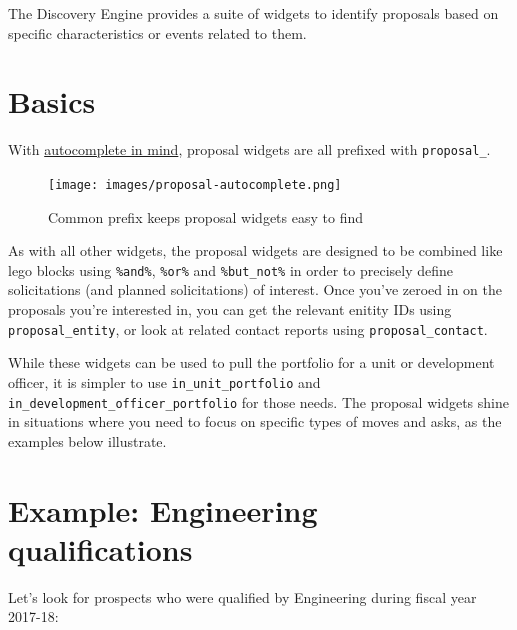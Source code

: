 \documentclass[]{book}
\newenvironment{Shaded}{\begin{snugshade}}{\end{snugshade}}
\newcommand{\DataTypeTok}[1]{\textcolor[rgb]{0.13,0.29,0.53}{#1}}
\newcommand{\DecValTok}[1]{\textcolor[rgb]{0.00,0.00,0.81}{#1}}
\newcommand{\KeywordTok}[1]{\textcolor[rgb]{0.13,0.29,0.53}{\textbf{#1}}}
\newcommand{\NormalTok}[1]{#1}
\newcommand{\OperatorTok}[1]{\textcolor[rgb]{0.81,0.36,0.00}{\textbf{#1}}}
\newcommand{\StringTok}[1]{\textcolor[rgb]{0.31,0.60,0.02}{#1}}
\begin{document}
The Discovery Engine provides a suite of widgets to identify proposals based on specific characteristics or events related to them.

\hypertarget{basics-2}{%
\section{Basics}\label{basics-2}}

With \protect\hyperlink{working-with-autocomplete}{autocomplete in mind}, proposal widgets are all prefixed with \texttt{proposal\_}.

\begin{figure}
\centering
\texttt{[image: images/proposal-autocomplete.png]}
\caption{Common prefix keeps proposal widgets easy to find}
\end{figure}

As with all other widgets, the proposal widgets are designed to be combined like lego blocks using \texttt{\%and\%}, \texttt{\%or\%} and \texttt{\%but\_not\%} in order to precisely define solicitations (and planned solicitations) of interest. Once you've zeroed in on the proposals you're interested in, you can get the relevant enitity IDs using \texttt{proposal\_entity}, or look at related contact reports using \texttt{proposal\_contact}.

While these widgets can be used to pull the portfolio for a unit or development officer, it is simpler to use \texttt{in\_unit\_portfolio} and \texttt{in\_development\_officer\_portfolio} for those needs. The proposal widgets shine in situations where you need to focus on specific types of moves and asks, as the examples below illustrate.

\hypertarget{example-engineering-qualifications}{%
\section{Example: Engineering qualifications}\label{example-engineering-qualifications}}

Let's look for prospects who were qualified by Engineering during fiscal year 2017-18:

\begin{Shaded}
\end{Shaded}
\end{document}
